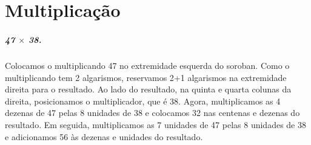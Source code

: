 \documentclass[12pt]{book}
\begin{document}
\vspace{0.2cm}
\begin{minipage}{0.3\textwidth}
\end{minipage}%
%
\begin{minipage}{0.3\textwidth}
\end{minipage}%
%
\begin{minipage}{0.3\textwidth}
\end{minipage}


\chapter{Multiplicação}

\paragraph{47 $\times$ 38.}
Colocamos o multiplicando 47 no extremidade
esquerda do soroban. Como o multiplicando
tem 2 algarismos, reservamos 2+1 algarismos
na extremidade direita para o resultado.
Ao lado do resultado, na quinta e quarta colunas
da direita, posicionamos o multiplicador,
que é 38. Agora, multiplicamos as 4 dezenas
de 47 pelas 8 unidades de 38 e colocamos 32 nas centenas
e dezenas do resultado. Em seguida,
multiplicamos as 7 unidades de 47 pelas 8
unidades de 38 e adicionamos 56 às
dezenas e unidades do resultado.\\
\end{document}
